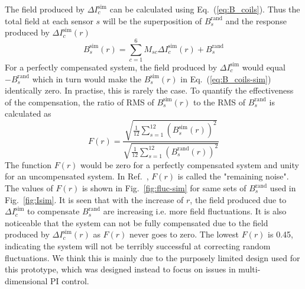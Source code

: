 

\FloatBarrier
The field produced by $ \Delta I_c^{\text{sim}}$ can be calculated using Eq.~(\ref{eq:B_coils}). Thus the total field at each sensor $s$ will be the superposition of $B_s^{\text{rand}}$ and the response produced by $ \Delta I_c^{\text{sim}}(r)$ 
\begin{equation}\label{eq:B_coils-sim}
    B_s^{\text{sim}}(r) =\sum_{c=1}^6 M_{sc} \Delta I_c^{\text{sim}}(r) + B_s^{\text{rand}}
\end{equation}
For a perfectly compensated system, the field produced by $ \Delta I_c^{\text{sim}}$ would equal $- B_s^{\text{rand}}$ which in turn would make the $B_s^{\text{sim}}(r)$ in Eq.~(\ref{eq:B_coils-sim}) identically zero. In practise, this is rarely the case. To quantify the effectiveness of the compensation,  the ratio of RMS of $B_s^{\text{sim}}(r)$ to the RMS of $B_s^{\text{rand}}$ is calculated as
\begin{equation}\label{eq:fluc}
    F(r)=\frac{\sqrt{\frac{1}{12} \sum_{s=1}^{12} (B_s^{\text{sim}}(r))^2}}{\sqrt{\frac{1}{12} \sum_{s=1}^{12} (B_s^{\text{rand}}(r))^2}}
\end{equation}
The function $F(r)$ would be zero for a perfectly compensated system and unity for an uncompensated system. In Ref.~\cite{bea}, $F(r)$ is called the "remaining noise". The values of $F(r)$ is shown in Fig.~\ref{fig:fluc-sim} for same sets of $B_s^{\text{rand}}$ used in Fig.~\ref{fig:Isim}. It is seen that with the increase of $r$, the field produced due to $\Delta I_c^{\text{sim}}$ to compensate $B_s^{\text{rand}}$  are increasing i.e. more field fluctuations. It is also noticeable that the system can not be fully compensated due to the field produced by $ \Delta I_c^{\text{sim}}(r)$ as $F(r)$ never goes to zero. The lowest $F(r)$ is 0.45, indicating the system will not be terribly successful at correcting random fluctuations. We think this is mainly due to the purposely limited design used for this prototype, which was designed instead to focus on issues in multi-dimensional PI control.

